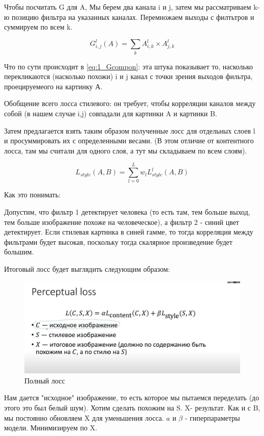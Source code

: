 	Чтобы посчитать G для A, Мы берем два канала i и j, затем мы рассматриваем k-ю позицию фильтра  на указанных каналах. Перемножаем выходы с филтьтров и суммируем по всем k.
	
	\begin{equation}
	G^{l}_{i,j} (A) = \sum_{k} A^{l}_{i,k} \times  A^{l}_{j,k}
	   \label{eq:1_Gcompon}
	\end{equation}
	
	
	Что по сути происходит в \ref{eq:1_Gcompon}: эта штука показывает то, насколько перекликаются (насколько похожи) i и j канал с точки зрения выходов фильтра, проецируемеого на картинку А. 
	
	Обобщение всего лосса стилевого: он требует, чтобы корреляции каналов между собой (в нашем случае i,j) совпадали для картинки A и картинки B. 
	
	Затем предлагается взять таким образом полученные лосс для отдельных слоев l и просуммировать их с определенными весами. (В этом отличие от контентного лосса, там мы считали для одного слоя, а тут мы складываем по всем слоям). 
	
	
	
			\begin{equation}
	    L_{style}(A,B) = \sum^{L}_{l=0} w_l L^{l}_{style}(A,B)
	    \label{eq:1_styletloss}
	\end{equation}
	
	Как это понимать: 
	
	Допустим, что фильтр 1 детектирует человека (то есть там, тем больше выход, тем больше изображение похоже на человеческое), а фильтр 2 - синий цвет детектирует. Если стилевая картинка в синей гамме, то тогда корреляция между фильтрами будет высокая, поскольку тогда скалярное произведение будет большим. 
	
	Итоговый лосс будет выглядить следующим образом:
	
		\begin{figure}[H]
\centering
\includegraphics[width=0.7\linewidth]{1_finalloss.jpg}
\caption{Полный лосс}
\label{fig:1_finalloss}
\end{figure}


Нам дается "исходное" изображение, то есть которое мы пытаемся переделать (до этого это был белый шум). Хотим сделать похожим на S. X- результат. Как и с B, мы постоянно обновляем X для уменьшения лосса. $a$ и $\beta$ - гиперпараметры модели.  Минимизируем по X.  
	
